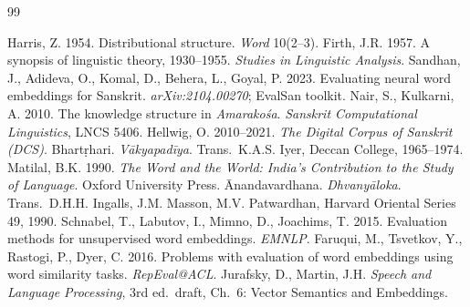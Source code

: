 \documentclass[11pt,a4paper]{article}
\begin{document}
\begin{thebibliography}{99}\small
\setlength{\itemsep}{0pt}

 Harris, Z. 1954. Distributional structure. \textit{Word} 10(2--3).
 Firth, J.R. 1957. A synopsis of linguistic theory, 1930--1955. \textit{Studies in Linguistic Analysis}.
 Sandhan, J., Adideva, O., Komal, D., Behera, L., Goyal, P. 2023. Evaluating neural word embeddings for Sanskrit. \textit{arXiv:2104.00270}; EvalSan toolkit.
 Nair, S., Kulkarni, A. 2010. The knowledge structure in \textit{Amarako\'sa}. \textit{Sanskrit Computational Linguistics}, LNCS 5406.
 Hellwig, O. 2010--2021. \textit{The Digital Corpus of Sanskrit (DCS)}.
 Bhart\d{r}hari. \textit{V\=akyapad\=iya}. Trans.\ K.A.S. Iyer, Deccan College, 1965--1974.
 Matilal, B.K. 1990. \textit{The Word and the World: India's Contribution to the Study of Language}. Oxford University Press.
 \=Anandavardhana. \textit{Dhvany\=aloka}. Trans.\ D.H.H. Ingalls, J.M. Masson, M.V. Patwardhan, Harvard Oriental Series 49, 1990.
 Schnabel, T., Labutov, I., Mimno, D., Joachims, T. 2015. Evaluation methods for unsupervised word embeddings. \textit{EMNLP}.
 Faruqui, M., Tsvetkov, Y., Rastogi, P., Dyer, C. 2016. Problems with evaluation of word embeddings using word similarity tasks. \textit{RepEval@ACL}.
 Jurafsky, D., Martin, J.H. \textit{Speech and Language Processing}, 3rd ed.\ draft, Ch.~6: Vector Semantics and Embeddings.

\end{thebibliography}
\end{document}
